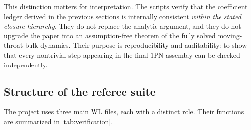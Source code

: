 \documentclass[11pt]{article}
\begin{document}
This distinction matters for interpretation. The scripts verify that the coefficient ledger
derived in the previous sections is internally consistent \emph{within the stated closure
hierarchy}. They do not replace the analytic argument, and they do not upgrade the paper
into an assumption-free theorem of the fully solved moving-throat bulk dynamics. Their
purpose is reproducibility and auditability: to show that every nontrivial step appearing
in the final \(1\)PN assembly can be checked independently.

\subsection{Structure of the referee suite}
\label{sec:verification-scripts}

The project uses three main WL files, each with a distinct role. Their functions are
summarized in \cref{tab:verification}.
\end{document}
